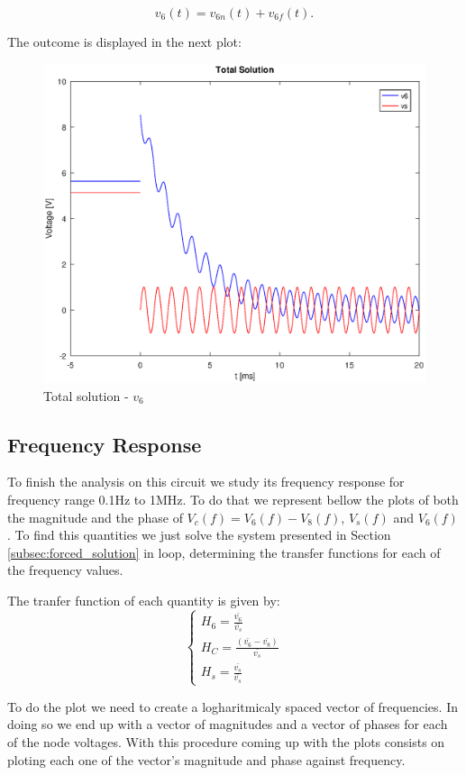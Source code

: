 \begin{equation}
  v_6(t) = v_{6n}(t) + v_{6f}(t).
  \label{eq:v6_sol}
\end{equation}

The outcome is displayed in the next plot:

\begin{figure}[H] \centering
\includegraphics[width=0.8\linewidth]{tot_sol.eps}
\caption{Total solution - $v_6$}
\label{fig:total solution}
\end{figure}


\newpage
\subsection{Frequency Response}
\label{subsec:frequency_response}

To finish the analysis on this circuit we study its frequency response for frequency range 0.1Hz to 1MHz. To do that we represent bellow the plots of both the magnitude and the phase of $V_{c}(f)=V_{6}(f)-V_{8}(f)$, $V_{s}(f)$ and $V_{6}(f)$.
To find this quantities we just solve the system presented in Section \ref{subsec:forced_solution} in loop, determining the transfer functions for each of the frequency values.
\par The tranfer function of each quantity is given by:
$$
\begin{cases}
  H_{6}=\frac{\bar{v_{6}}}{\bar{v_{s}}}\\
  H_{C}=\frac{(\bar{v_{6}}-\bar{v_{8}})}{\bar{v_{s}}}\\
  H_{s}=\frac{\bar{v_{s}}}{\bar{v_{s}}}
\end{cases}
$$


To do the plot we need to create a logharitmicaly spaced vector of frequencies. In doing so we end up with a vector of magnitudes and a vector of phases for each of the node voltages. With this procedure coming up with the plots consists on ploting each one of the vector's magnitude and phase against frequency.

